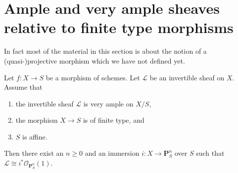 \section{Ample and very ample sheaves relative to finite type morphisms}
\label{section-ample-finite-type}

\noindent
In fact most of the material in this section is about the notion of
a (quasi-)projective morphism which we have not defined yet.

\begin{lemma}
\label{lemma-very-ample-finite-type-over-affine}
Let $f : X \to S$ be a morphism of schemes.
Let $\mathcal{L}$ be an invertible sheaf on $X$.
Assume that
\begin{enumerate}
\item the invertible sheaf $\mathcal{L}$ is very ample on $X/S$,
\item the morphism $X \to S$ is of finite type, and
\item $S$ is affine.
\end{enumerate}
Then there exist an $n \geq 0$ and an immersion
$i : X \to \mathbf{P}^n_S$ over $S$ such that
$\mathcal{L} \cong i^*\mathcal{O}_{\mathbf{P}^n_S}(1)$.
\end{lemma}

